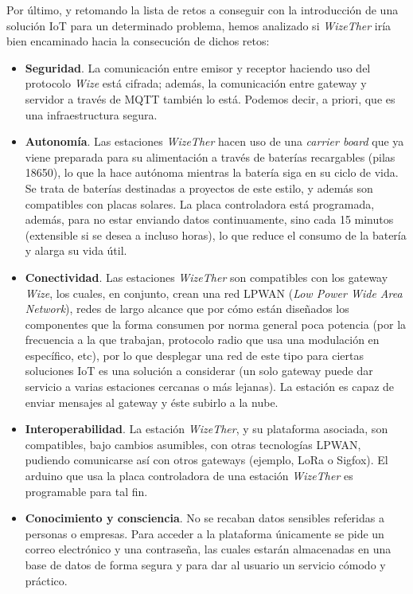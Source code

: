 \documentclass[12pt]{article}
\begin{document}

\noindent Por último, y retomando la lista de retos a conseguir con la introducción de una solución IoT para un determinado problema, hemos analizado si \textit{WizeTher} iría bien encaminado hacia la consecución de dichos retos: \\

\begin{itemize}
	\item \textbf{Seguridad}. La comunicación entre emisor y receptor haciendo uso del protocolo \textit{Wize} está cifrada; además, la comunicación entre gateway y servidor a través de MQTT también lo está. Podemos decir, a priori, que es una infraestructura segura.
	\item \textbf{Autonomía}. Las estaciones \textit{WizeTher} hacen uso de una \textit{carrier board} que ya viene preparada para su alimentación a través de baterías recargables (pilas 18650), lo que la hace autónoma mientras la batería siga en su ciclo de vida. Se trata de baterías destinadas a proyectos de este estilo, y además son compatibles con placas solares. La placa controladora está programada, además, para no estar enviando datos continuamente, sino cada 15 minutos (extensible si se desea a incluso horas), lo que reduce el consumo de la batería y alarga su vida útil.
	\item \textbf{Conectividad}. Las estaciones \textit{WizeTher} son compatibles con los gateway \textit{Wize}, los cuales, en conjunto, crean una red LPWAN (\textit{Low Power Wide Area Network}), redes de largo alcance que por cómo están diseñados los componentes que la forma consumen por norma general poca potencia (por la frecuencia a la que trabajan, protocolo radio que usa una modulación en específico, etc), por lo que desplegar una red de este tipo para ciertas soluciones IoT es una solución a considerar (un solo gateway puede dar servicio a varias estaciones cercanas o más lejanas). La estación es capaz de enviar mensajes al gateway y éste subirlo a la nube. 
	\item \textbf{Interoperabilidad}. La estación \textit{WizeTher}, y su plataforma asociada, son compatibles, bajo cambios asumibles, con otras tecnologías LPWAN, pudiendo comunicarse así con otros gateways (ejemplo, LoRa o Sigfox). El arduino que usa la placa controladora de una estación \textit{WizeTher} es programable para tal fin.
	\item \textbf{Conocimiento y consciencia}. No se recaban datos sensibles referidas a personas o empresas. Para acceder a la plataforma únicamente se pide un correo electrónico y una contraseña, las cuales estarán almacenadas en una base de datos de forma segura y para dar al usuario un servicio cómodo y práctico.

\end{itemize}
\end{document}

